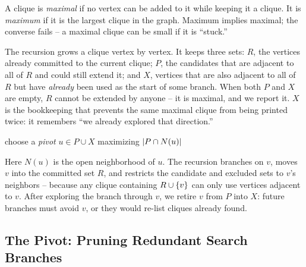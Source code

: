 \begin{definition}
\label{ch29:def-maximal}
A clique is \emph{maximal} if no vertex can be added to it while keeping it a
clique. It is \emph{maximum} if it is the largest clique in the graph. Maximum
implies maximal; the converse fails -- a maximal clique can be small if it is
``stuck.''
\end{definition}

\begin{intuitionbox}
The recursion grows a clique vertex by vertex. It keeps three sets: $R$, the
vertices already committed to the current clique; $P$, the candidates that are
adjacent to all of $R$ and could still extend it; and $X$, vertices that are also
adjacent to all of $R$ but have \emph{already} been used as the start of some
branch. When both $P$ and $X$ are empty, $R$ cannot be extended by anyone -- it
is maximal, and we report it. $X$ is the bookkeeping that prevents the same
maximal clique from being printed twice: it remembers ``we already explored that
direction.''
\end{intuitionbox}

\begin{algorithm}[H]
\caption{\textsc{BronKerbosch}$(R,P,X)$ -- enumerate maximal cliques}
\label{ch29:alg-bk}
\DontPrintSemicolon
{}
choose a \emph{pivot} $u\in P\cup X$ maximizing $\lvert P\cap N(u)\rvert$\;
\end{algorithm}


Here $N(u)$ is the open neighborhood of $u$. The recursion branches on $v$, moves
$v$ into the committed set $R$, and restricts the candidate and excluded sets to
$v$'s neighbors -- because any clique containing $R\cup\{v\}$ can only use
vertices adjacent to $v$. After exploring the branch through $v$, we retire $v$
from $P$ into $X$: future branches must avoid $v$, or they would re-list cliques
already found.

\subsection{The Pivot: Pruning Redundant Search Branches}
\label{ch29:bk-pivot}

